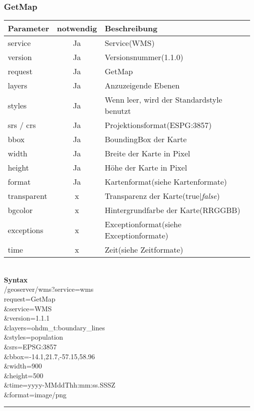 \subsubsection{GetMap}\begin{tabular}{lcl}
\textbf{Parameter} & \textbf{notwendig} & \textbf{Beschreibung}\\
\hline 
service & Ja & Service(WMS) \\ 
\hline 
version & Ja & Versionsnummer(1.1.0) \\ 
\hline 
request & Ja & GetMap \\ 
\hline 
layers & Ja & Anzuzeigende Ebenen \\ 
\hline 
styles & Ja & Wenn leer, wird der Standardstyle benutzt \\ 
\hline 
srs / crs & Ja & Projektionsformat(ESPG:3857) \\ 
\hline 
bbox & Ja & BoundingBox der Karte \\ 
\hline 
width & Ja & Breite der Karte in Pixel \\ 
\hline 
height & Ja & H\"ohe der Karte in Pixel \\ 
\hline 
format & Ja & Kartenformat(siehe Kartenformate)\\
\hline 
transparent & x & Transparenz der Karte(true|\emph{false}) \\ 
\hline 
bgcolor & x & Hintergrundfarbe der Karte(RRGGBB) \\ 
\hline 
exceptions & x & Exceptionformat(siehe Exceptionformate) \\ 
\hline 
time & x & Zeit(siehe Zeitformate) \\ 
\hline 
\end{tabular} \\

\textbf{Syntax}\\
/geoserver/wms?service=wms\\
request=GetMap\\
\&service=WMS\\
\&version=1.1.1\\
\&layers=ohdm\_t:boundary\_lines\\
\&styles=population\\
\&srs=EPSG:3857\\
\&bbox=-14.1,21.7,-57.15,58.96\\
\&width=900\\
\&height=500\\
\&time=yyyy-MMddThh:mm:ss.SSSZ\\
\&format=image/png\\
\hrule
\newpage
